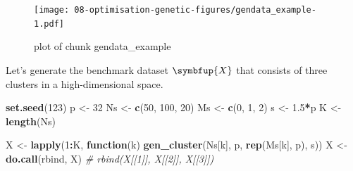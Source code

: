 \documentclass[10pt,b5paper,krantz1]{krantz}
\newenvironment{Shaded}{\begin{snugshade}}{\end{snugshade}}
\newcommand{\CommentTok}[1]{\textcolor[rgb]{0.37,0.37,0.37}{\textit{#1}}}
\newcommand{\ControlFlowTok}[1]{\textcolor[rgb]{0.27,0.27,0.27}{\textbf{#1}}}
\newcommand{\DataTypeTok}[1]{\textcolor[rgb]{0.27,0.27,0.27}{#1}}
\newcommand{\DecValTok}[1]{\textcolor[rgb]{0.06,0.06,0.06}{#1}}
\newcommand{\FloatTok}[1]{\textcolor[rgb]{0.06,0.06,0.06}{#1}}
\newcommand{\KeywordTok}[1]{\textcolor[rgb]{0.27,0.27,0.27}{\textbf{#1}}}
\newcommand{\NormalTok}[1]{#1}
\newcommand{\OperatorTok}[1]{\textcolor[rgb]{0.43,0.43,0.43}{\textbf{#1}}}
\newcommand{\OtherTok}[1]{\textcolor[rgb]{0.37,0.37,0.37}{#1}}
\newcommand{\StringTok}[1]{\textcolor[rgb]{0.5,0.5,0.5}{#1}}
\renewcommand{\mathbf}[1]{\symbfup{#1}}
\begin{document}
\begin{Shaded}
\end{Shaded}

\begin{figure}
\hypertarget{fig:gendata_example}{%
\centering
\texttt{[image: 08-optimisation-genetic-figures/gendata\_example-1.pdf]}
\caption{plot of chunk gendata\_example}\label{fig:gendata_example}
}
\end{figure}

Let's generate the benchmark dataset \(\mathbf{X}\)
that consists of three clusters in a high-dimensional space.

\begin{Shaded}
\begin{Highlighting}[]
\KeywordTok{set.seed}\NormalTok{(}\DecValTok{123}\NormalTok{)}
\NormalTok{p  <-}\StringTok{ }\DecValTok{32}
\NormalTok{Ns <-}\StringTok{ }\KeywordTok{c}\NormalTok{(}\DecValTok{50}\NormalTok{, }\DecValTok{100}\NormalTok{, }\DecValTok{20}\NormalTok{)}
\NormalTok{Ms <-}\StringTok{ }\KeywordTok{c}\NormalTok{(}\DecValTok{0}\NormalTok{, }\DecValTok{1}\NormalTok{, }\DecValTok{2}\NormalTok{)}
\NormalTok{s  <-}\StringTok{ }\FloatTok{1.5}\OperatorTok{*}\NormalTok{p}
\NormalTok{K  <-}\StringTok{ }\KeywordTok{length}\NormalTok{(Ns)}

\NormalTok{X <-}\StringTok{ }\KeywordTok{lapply}\NormalTok{(}\DecValTok{1}\OperatorTok{:}\NormalTok{K, }\ControlFlowTok{function}\NormalTok{(k)}
    \KeywordTok{gen_cluster}\NormalTok{(Ns[k], p, }\KeywordTok{rep}\NormalTok{(Ms[k], p), s))}
\NormalTok{X <-}\StringTok{ }\KeywordTok{do.call}\NormalTok{(rbind, X) }\CommentTok{# rbind(X[[1]], X[[2]], X[[3]])}
\end{Highlighting}
\end{Shaded}
\end{document}
